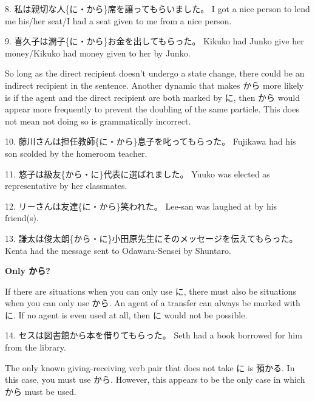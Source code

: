 \par{8. 私は親切な人\{に・から\}席を譲ってもらいました。 \hfill\break
I got a nice person to lend me his\slash her seat\slash I had a seat given to me from a nice person. }

\par{9. 喜久子は潤子\{に・から\}お金を出してもらった。 \hfill\break
Kikuko had Junko give her money\slash Kikuko had money given to her by Junko. }

\par{ So long as the direct recipient doesn't undergo a state change, there could be an indirect recipient in the sentence. Another dynamic that makes から more likely is if the agent and the direct recipient are both marked by に, then から would appear more frequently to prevent the doubling of the same particle. This does not mean not doing so is grammatically incorrect. }

\par{10. 藤川さんは担任教師\{に・から\}息子を叱ってもらった。 \hfill\break
Fujikawa had his son scolded by the homeroom teacher. }

\par{11. 悠子は級友\{から・に\}代表に選ばれました。 \hfill\break
Yuuko was elected as representative by her classmates. }

\par{12. リーさんは友達\{に・から\}笑われた。 \hfill\break
Lee-san was laughed at by his friend(s). }

\par{13. 謙太は俊太朗\{から・に\}小田原先生にそのメッセージを伝えてもらった。 \hfill\break
Kenta had the message sent to Odawara-Sensei by Shuntaro. }

\begin{center}
\textbf{Only から? }
\end{center}

\par{  If there are situations when you can only use に, there must also be situations when you can only use から. An agent of a transfer can always be marked with に. If no agent is even used at all, then に would not be possible. }

\par{14. セスは図書館から本を借りてもらった。 \hfill\break
Seth had a book borrowed for him from the library. }

\par{ The only known giving-receiving verb pair that does not take に is 預かる. In this case, you must use から. However, this appears to be the only case in which から must be used. }

